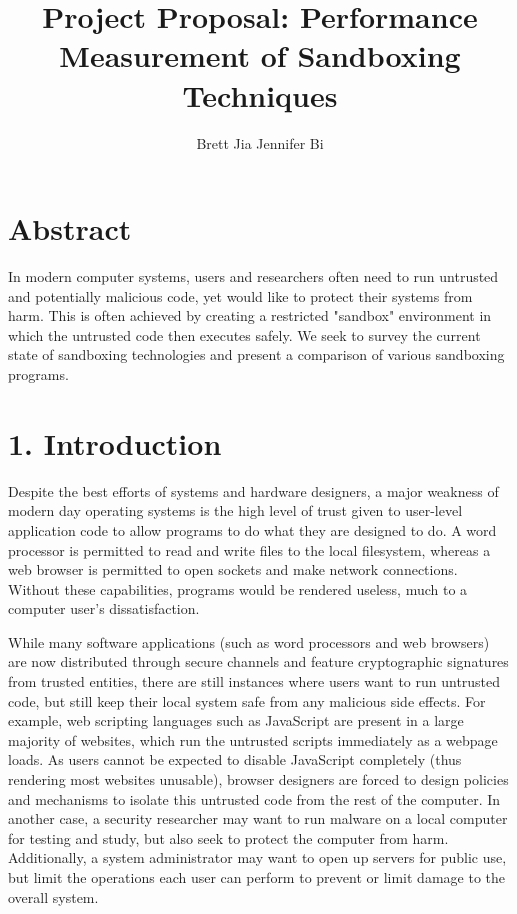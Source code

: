 \documentclass{proc}
\begin{document}
\title{Project Proposal: Performance Measurement of Sandboxing Techniques}

\author{Brett Jia \hspace{1em} Jennifer Bi}

\maketitle

\section*{Abstract}

In modern computer systems, users and researchers often need to run untrusted and potentially malicious code, yet would like to protect their systems from harm. This is often achieved by creating a restricted "sandbox" environment in which the untrusted code then executes safely. We seek to survey the current state of sandboxing technologies and present a comparison of various sandboxing programs.

\section*{1. Introduction}

Despite the best efforts of systems and hardware designers, a major weakness of modern day operating systems is the high level of trust given to user-level application code to allow programs to do what they are designed to do. A word processor is permitted to read and write files to the local filesystem, whereas a web browser is permitted to open sockets and make network connections. Without these capabilities, programs would be rendered useless, much to a computer user's dissatisfaction.

While many software applications (such as word processors and web browsers) are now distributed through secure channels and feature cryptographic signatures from trusted entities, there are still instances where users want to run untrusted code, but still keep their local system safe from any malicious side effects. For example, web scripting languages such as JavaScript are present in a large majority of websites, which run the untrusted scripts immediately as a webpage loads. As users cannot be expected to disable JavaScript completely (thus rendering most websites unusable), browser designers are forced to design policies and mechanisms to isolate this untrusted code from the rest of the computer. In another case, a security researcher may want to run malware on a local computer for testing and study, but also seek to protect the computer from harm. Additionally, a system administrator may want to open up servers for public use, but limit the operations each user can perform to prevent or limit damage to the overall system.
\end{document}
